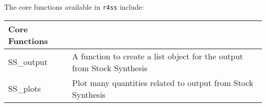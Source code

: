 The core functions available in \texttt{r4ss} include:
\begin{center}
	\begin{longtable}{p{4.5cm} p{10.52cm}}
		\hline
		Core Functions & \Tstrut\Bstrut\\
		\hline
		SS\_output \Tstrut& A function to create a list object for the output from Stock Synthesis\\
		SS\_plots  \Tstrut& Plot many quantities related to output from Stock Synthesis\\
		\hline
		
	

\end{longtable}
\end{center}
